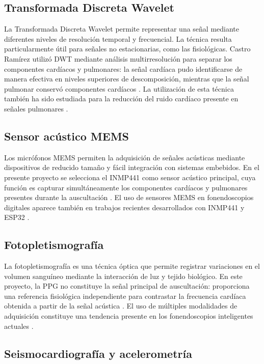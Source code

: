 \subsection{Transformada Discreta Wavelet}

La Transformada Discreta Wavelet permite representar una señal mediante diferentes niveles de resolución temporal y frecuencial. La técnica resulta particularmente útil para señales no estacionarias, como las fisiológicas. Castro Ramírez utilizó DWT mediante análisis multirresolución para separar los componentes cardíacos y pulmonares: la señal cardíaca pudo identificarse de manera efectiva en niveles superiores de descomposición, mientras que la señal pulmonar conservó componentes cardíacos . La utilización de esta técnica también ha sido estudiada para la reducción del ruido cardíaco presente en señales pulmonares .

\subsection{Sensor acústico MEMS}

Los micrófonos MEMS permiten la adquisición de señales acústicas mediante dispositivos de reducido tamaño y fácil integración con sistemas embebidos. En el presente proyecto se selecciona el INMP441 como sensor acústico principal, cuya función es capturar simultáneamente los componentes cardíacos y pulmonares presentes durante la auscultación . El uso de sensores MEMS en fonendoscopios digitales aparece también en trabajos recientes desarrollados con INMP441 y ESP32 .

\subsection{Fotopletismografía}

La fotopletismografía es una técnica óptica que permite registrar variaciones en el volumen sanguíneo mediante la interacción de luz y tejido biológico. En este proyecto, la PPG no constituye la señal principal de auscultación: proporciona una referencia fisiológica independiente para contrastar la frecuencia cardíaca obtenida a partir de la señal acústica . El uso de múltiples modalidades de adquisición constituye una tendencia presente en los fonendoscopios inteligentes actuales .

\subsection{Seismocardiografía y acelerometría}

